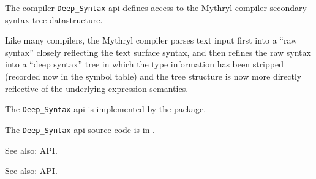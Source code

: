 
The compiler {\tt Deep\_Syntax} api defines access to 
the Mythryl compiler 
secondary syntax tree datastructure.

Like many compilers, the Mythryl 
compiler parses text input first into a ``raw syntax'' closely reflecting 
the text surface syntax, and then refines the raw syntax into a 
``deep syntax'' tree in which the type information has been stripped 
(recorded now in the symbol table) and the tree structure is now more 
directly reflective of the underlying expression semantics.

The {\tt Deep\_Syntax} api is implemented by the  package.

The {\tt Deep\_Syntax} api source code is in .

See also:   API.

See also:   API.

